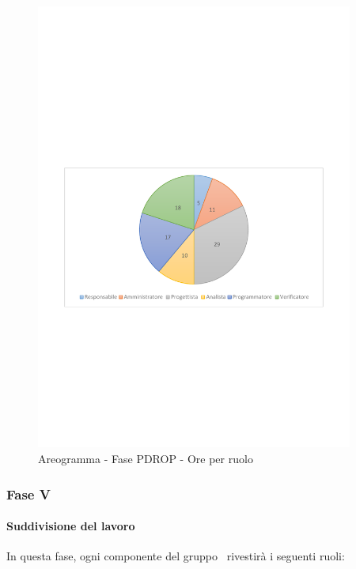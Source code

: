 \documentclass[../PianoProgetto.tex]{subfiles}
\begin{document}
	\begin{figure}[!h]
		\centering
		\includegraphics[width=0.93\textwidth , trim=2cm 9.5cm 2cm 11cm]{grafici/PDROP/PDROP-ore-ruolo}
			\caption{Areogramma - Fase PDROP - Ore per ruolo}
		\label{fig:CircleChart-fasePDRD_ore_r}
	\end{figure}
\vfill	
\newpage
	
	\subsubsection{Fase V}
				\paragraph{Suddivisione del lavoro}
					In questa fase, ogni componente del gruppo \leaf\ rivestirà i seguenti ruoli:
	
\end{document}

